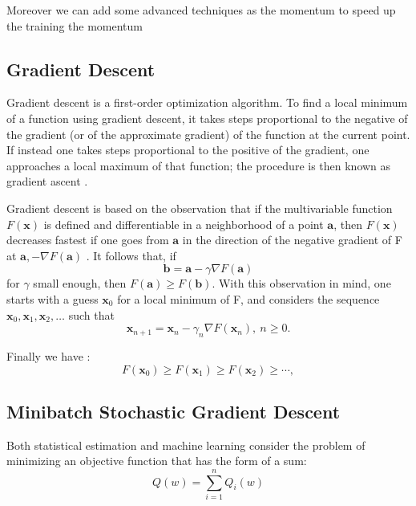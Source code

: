 Moreover we can add some advanced techniques as the momentum to speed up the training the momentum 


\subsection{Gradient Descent}
Gradient descent is a first-order optimization algorithm. To find a local minimum of a function using gradient descent, it takes steps proportional to the negative of the gradient (or of the approximate gradient) of the function at the current point. If instead one takes steps proportional to the positive of the gradient, one approaches a local maximum of that function; the procedure is then known as gradient ascent \cite{Kiwiel2001,Qian1999}.

Gradient descent is based on the observation that if the multivariable function $F(\mathbf{x})$ is defined and differentiable in a neighborhood of a point $\mathbf{a}$, then $F(\mathbf{x})$ decreases fastest if one goes from $\mathbf{a}$ in the direction of the negative gradient of F at $\mathbf{a}, -\nabla F(\mathbf{a})$ \cite{Yuan1999}. It follows that, if
\begin{equation}
\mathbf{b} = \mathbf{a}-\gamma\nabla F(\mathbf{a})
\end{equation}
for $\gamma$ small enough, then $F(\mathbf{a})\geq F(\mathbf{b})$. With this observation in mind, one starts with a guess $\mathbf{x}_0$ for a local minimum of F, and considers the sequence $\mathbf{x}_0, \mathbf{x}_1, \mathbf{x}_2, \dots$ such that
\begin{equation}
\mathbf{x}_{n+1}=\mathbf{x}_n-\gamma_n \nabla F(\mathbf{x}_n),\ n \ge 0.
\end{equation}

Finally we have \cite{Cauchy1847}:
\begin{equation}
F(\mathbf{x}_0)\ge F(\mathbf{x}_1)\ge F(\mathbf{x}_2)\ge \cdots,
\end{equation}


\subsection{Minibatch Stochastic Gradient Descent}

Both statistical estimation and machine learning consider the problem of minimizing an objective function that has the form of a sum:
\begin{equation}
Q(w) = \sum_{i=1}^n Q_i(w)
\end{equation}

